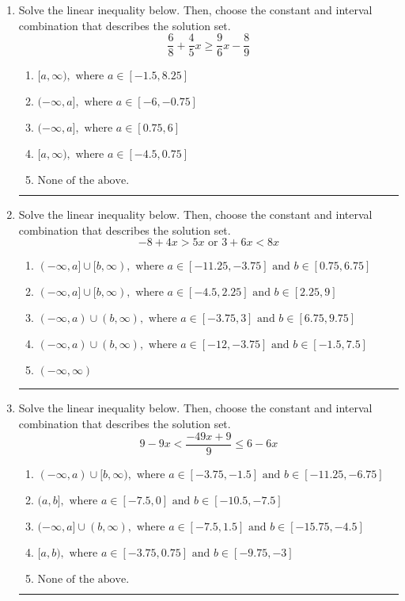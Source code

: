 \documentclass[14pt]{extbook}
\newcommand{\litem}[1]{\item#1\hspace*{-1cm}\rule{\textwidth}{0.4pt}}
\begin{document}
\begin{enumerate}
\litem{
Solve the linear inequality below. Then, choose the constant and interval combination that describes the solution set.\[ \frac{6}{8} + \frac{4}{5} x \geq \frac{9}{6} x - \frac{8}{9} \]\begin{enumerate}[label=\Alph*.]
\item \( [a, \infty), \text{ where } a \in [-1.5, 8.25] \)
\item \( (-\infty, a], \text{ where } a \in [-6, -0.75] \)
\item \( (-\infty, a], \text{ where } a \in [0.75, 6] \)
\item \( [a, \infty), \text{ where } a \in [-4.5, 0.75] \)
\item \( \text{None of the above}. \)

\end{enumerate} }
\litem{
Solve the linear inequality below. Then, choose the constant and interval combination that describes the solution set.\[ -8 + 4 x > 5 x \text{ or } 3 + 6 x < 8 x \]\begin{enumerate}[label=\Alph*.]
\item \( (-\infty, a] \cup [b, \infty), \text{ where } a \in [-11.25, -3.75] \text{ and } b \in [0.75, 6.75] \)
\item \( (-\infty, a] \cup [b, \infty), \text{ where } a \in [-4.5, 2.25] \text{ and } b \in [2.25, 9] \)
\item \( (-\infty, a) \cup (b, \infty), \text{ where } a \in [-3.75, 3] \text{ and } b \in [6.75, 9.75] \)
\item \( (-\infty, a) \cup (b, \infty), \text{ where } a \in [-12, -3.75] \text{ and } b \in [-1.5, 7.5] \)
\item \( (-\infty, \infty) \)

\end{enumerate} }
\litem{
Solve the linear inequality below. Then, choose the constant and interval combination that describes the solution set.\[ 9 - 9 x < \frac{-49 x + 9}{9} \leq 6 - 6 x \]\begin{enumerate}[label=\Alph*.]
\item \( (-\infty, a) \cup [b, \infty), \text{ where } a \in [-3.75, -1.5] \text{ and } b \in [-11.25, -6.75] \)
\item \( (a, b], \text{ where } a \in [-7.5, 0] \text{ and } b \in [-10.5, -7.5] \)
\item \( (-\infty, a] \cup (b, \infty), \text{ where } a \in [-7.5, 1.5] \text{ and } b \in [-15.75, -4.5] \)
\item \( [a, b), \text{ where } a \in [-3.75, 0.75] \text{ and } b \in [-9.75, -3] \)
\item \( \text{None of the above.} \)


\end{enumerate}}
\end{enumerate}
\end{document}
